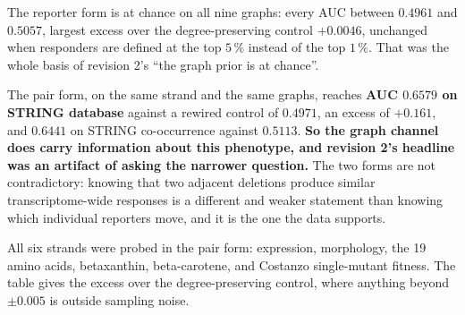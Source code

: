 
The reporter form is at chance on all nine graphs: every AUC between $0.4961$ and $0.5057$,
largest excess over the degree-preserving control $+0.0046$, unchanged when responders are
defined at the top $5\,\%$ instead of the top $1\,\%$. That was the whole basis of revision
2's ``the graph prior is at chance''.

The pair form, on the same strand and the same graphs, reaches
\textbf{AUC $0.6579$ on STRING database} against a rewired control of $0.4971$, an excess of
$+0.161$, and $0.6441$ on STRING co-occurrence against $0.5113$. \textbf{So the graph channel
does carry information about this phenotype, and revision 2's headline was an artifact of
asking the narrower question.} The two forms are not contradictory: knowing that two adjacent
deletions produce similar transcriptome-wide responses is a different and weaker statement
than knowing which individual reporters move, and it is the one the data supports.

 All six strands were probed in the pair form: expression,
morphology, the 19 amino acids, betaxanthin, beta-carotene, and Costanzo single-mutant
fitness. The table gives the excess over the degree-preserving control, where anything
beyond $\pm 0.005$ is outside sampling noise.

